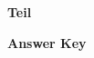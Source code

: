 \documentclass[../Exercise.tex]{subfiles}
\begin{document}
\begin{center}
	\large{\textbf{Teil }}
\end{center} 
\begin{framed}
\end{framed}
\vspace{7ex}
\begin{framed}
\textbf{Answer Key}
\begin{multicols}{3}
\end{multicols}
\end{framed}
\vspace{7ex}
\end{document}

